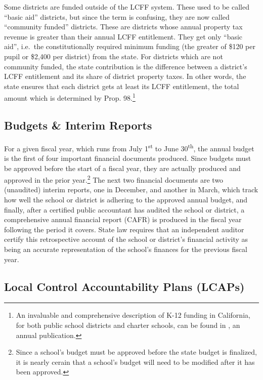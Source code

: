 Some districts are funded outside of the LCFF system. These used to be called ``basic aid'' districts, but since the term is confusing, they are now called ``community funded'' districts. These are districts whose annual property tax revenue is greater than their annual LCFF entitlement. They get only ``basic aid'', i.e.~the constitutionally required minimum funding (the greater of \$120 per pupil or \$2,400 per district) from the state. For districts which are not community funded, the state contribution is the difference between a district's LCFF entitlement and its share of district property taxes. In other words, the state ensures that each district gets at least its LCFF entitlement, the total amount which is determined by Prop. 98.\footnote{An invaluable and comprehensive description of K-12 funding in California, for both public school districts and charter schools, can be found in \textcite{Aguinaldo.etal2022}, an annual publication.}

\subsection{Budgets \& Interim Reports}\label{sec:budgets}\indent

For a given fiscal year, which runs from July 1\textsuperscript{st} to June 30\textsuperscript{th}, the annual budget is the first of four important financial documents produced. Since budgets must be approved before the start of a fiscal year, they are actually produced and approved in the prior year.\footnote{Since a school's budget must be approved before the state budget is finalized, it is nearly cerain that a school's budget will need to be modified after it has been approved.} The next two financial documents are two (unaudited) interim reports, one in December, and another in March,  which track how well the school or district is adhering to the approved annual budget, and finally, after a certified public accountant has audited the school or district, a comprehensive annual financial report (CAFR) is produced in the fiscal year following the period it covers. State law requires that an independent auditor certify this retrospective account of the school or district's financial activity as being an accurate representation of the school's finances for the previous fiscal year.

\subsection{Local Control Accountability Plans (LCAPs)}\label{sec:lcaps}\indent

